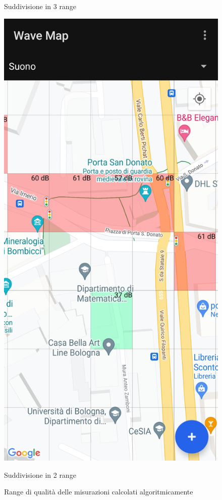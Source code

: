 \documentclass[11pt]{article}
\begin{document}
\begin{figure}[H]
\begin{minipage}[b]{0.25\textwidth}
      \caption*{Suddivisione in 3 range}
    \end{minipage}
    \hspace*{1cm}
    \begin{minipage}[b]{0.25\textwidth}
      \includegraphics[width=\textwidth]{./img/overview/map_ranges.jpg}
      \caption*{Suddivisione in 2 range}
    \end{minipage}
    \caption{Range di qualità delle misurazioni calcolati algoritmicamente} \label{fig:overview_ranges}
\end{figure}
\end{document}
